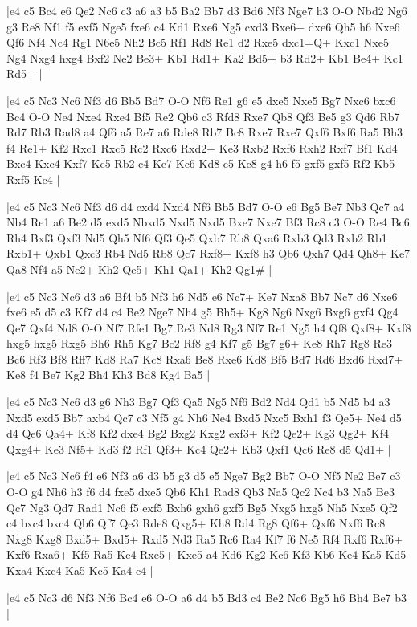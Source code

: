\whitename{}
\blackname{}
\makegametitle
|e4 c5 Bc4 e6 Qe2 Nc6 c3 a6 a3 b5 Ba2 Bb7 d3 Bd6 Nf3 Nge7 h3 O-O Nbd2 Ng6 g3 Re8 Nf1 f5 exf5 Nge5 fxe6 c4 Kd1 Rxe6 Ng5 cxd3 Bxe6+ dxe6 Qh5 h6 Nxe6 Qf6 Nf4 Nc4 Rg1 N6e5 Nh2 Bc5 Rf1 Rd8 Re1 d2 Rxe5 dxc1=Q+ Kxc1 Nxe5 Ng4 Nxg4 hxg4 Bxf2 Ne2 Be3+ Kb1 Rd1+ Ka2 Bd5+ b3 Rd2+ Kb1 Be4+ Kc1 Rd5+  |

\whitename{}
\blackname{}
\makegametitle
|e4 c5 Nc3 Nc6 Nf3 d6 Bb5 Bd7 O-O Nf6 Re1 g6 e5 dxe5 Nxe5 Bg7 Nxc6 bxc6 Bc4 O-O Ne4 Nxe4 Rxe4 Bf5 Re2 Qb6 c3 Rfd8 Rxe7 Qb8 Qf3 Be5 g3 Qd6 Rb7 Rd7 Rb3 Rad8 a4 Qf6 a5 Re7 a6 Rde8 Rb7 Bc8 Rxe7 Rxe7 Qxf6 Bxf6 Ra5 Bh3 f4 Re1+ Kf2 Rxc1 Rxc5 Rc2 Rxc6 Rxd2+ Ke3 Rxb2 Rxf6 Rxh2 Rxf7 Bf1 Kd4 Bxc4 Kxc4 Kxf7 Kc5 Rb2 c4 Ke7 Kc6 Kd8 c5 Kc8 g4 h6 f5 gxf5 gxf5 Rf2 Kb5 Rxf5 Kc4  |

\whitename{}
\blackname{}
\makegametitle
|e4 c5 Nc3 Nc6 Nf3 d6 d4 cxd4 Nxd4 Nf6 Bb5 Bd7 O-O e6 Bg5 Be7 Nb3 Qc7 a4 Nb4 Re1 a6 Be2 d5 exd5 Nbxd5 Nxd5 Nxd5 Bxe7 Nxe7 Bf3 Rc8 c3 O-O Re4 Bc6 Rh4 Bxf3 Qxf3 Nd5 Qh5 Nf6 Qf3 Qe5 Qxb7 Rb8 Qxa6 Rxb3 Qd3 Rxb2 Rb1 Rxb1+ Qxb1 Qxc3 Rb4 Nd5 Rb8 Qc7 Rxf8+ Kxf8 h3 Qb6 Qxh7 Qd4 Qh8+ Ke7 Qa8 Nf4 a5 Ne2+ Kh2 Qe5+ Kh1 Qa1+ Kh2 Qg1\#  |

\whitename{}
\blackname{}
\makegametitle
|e4 c5 Nc3 Nc6 d3 a6 Bf4 b5 Nf3 h6 Nd5 e6 Nc7+ Ke7 Nxa8 Bb7 Nc7 d6 Nxe6 fxe6 e5 d5 c3 Kf7 d4 c4 Be2 Nge7 Nh4 g5 Bh5+ Kg8 Ng6 Nxg6 Bxg6 gxf4 Qg4 Qe7 Qxf4 Nd8 O-O Nf7 Rfe1 Bg7 Re3 Nd8 Rg3 Nf7 Re1 Ng5 h4 Qf8 Qxf8+ Kxf8 hxg5 hxg5 Rxg5 Bh6 Rh5 Kg7 Bc2 Rf8 g4 Kf7 g5 Bg7 g6+ Ke8 Rh7 Rg8 Re3 Bc6 Rf3 Bf8 Rff7 Kd8 Ra7 Kc8 Rxa6 Be8 Rxe6 Kd8 Bf5 Bd7 Rd6 Bxd6 Rxd7+ Ke8 f4 Be7 Kg2 Bh4 Kh3 Bd8 Kg4 Ba5  |

\whitename{}
\blackname{}
\makegametitle
|e4 c5 Nc3 Nc6 d3 g6 Nh3 Bg7 Qf3 Qa5 Ng5 Nf6 Bd2 Nd4 Qd1 b5 Nd5 b4 a3 Nxd5 exd5 Bb7 axb4 Qc7 c3 Nf5 g4 Nh6 Ne4 Bxd5 Nxc5 Bxh1 f3 Qe5+ Ne4 d5 d4 Qe6 Qa4+ Kf8 Kf2 dxe4 Bg2 Bxg2 Kxg2 exf3+ Kf2 Qe2+ Kg3 Qg2+ Kf4 Qxg4+ Ke3 Nf5+ Kd3 f2 Rf1 Qf3+ Kc4 Qe2+ Kb3 Qxf1 Qc6 Re8 d5 Qd1+  |

\whitename{}
\blackname{}
\makegametitle
|e4 c5 Nc3 Nc6 f4 e6 Nf3 a6 d3 b5 g3 d5 e5 Nge7 Bg2 Bb7 O-O Nf5 Ne2 Be7 c3 O-O g4 Nh6 h3 f6 d4 fxe5 dxe5 Qb6 Kh1 Rad8 Qb3 Na5 Qc2 Nc4 b3 Na5 Be3 Qc7 Ng3 Qd7 Rad1 Nc6 f5 exf5 Bxh6 gxh6 gxf5 Bg5 Nxg5 hxg5 Nh5 Nxe5 Qf2 c4 bxc4 bxc4 Qb6 Qf7 Qe3 Rde8 Qxg5+ Kh8 Rd4 Rg8 Qf6+ Qxf6 Nxf6 Rc8 Nxg8 Kxg8 Bxd5+ Bxd5+ Rxd5 Nd3 Ra5 Rc6 Ra4 Kf7 f6 Ne5 Rf4 Rxf6 Rxf6+ Kxf6 Rxa6+ Kf5 Ra5 Ke4 Rxe5+ Kxe5 a4 Kd6 Kg2 Kc6 Kf3 Kb6 Ke4 Ka5 Kd5 Kxa4 Kxc4 Ka5 Kc5 Ka4 c4  |

\whitename{}
\blackname{}
\makegametitle
|e4 c5 Nc3 d6 Nf3 Nf6 Bc4 e6 O-O a6 d4 b5 Bd3 c4 Be2 Nc6 Bg5 h6 Bh4 Be7 b3  |

